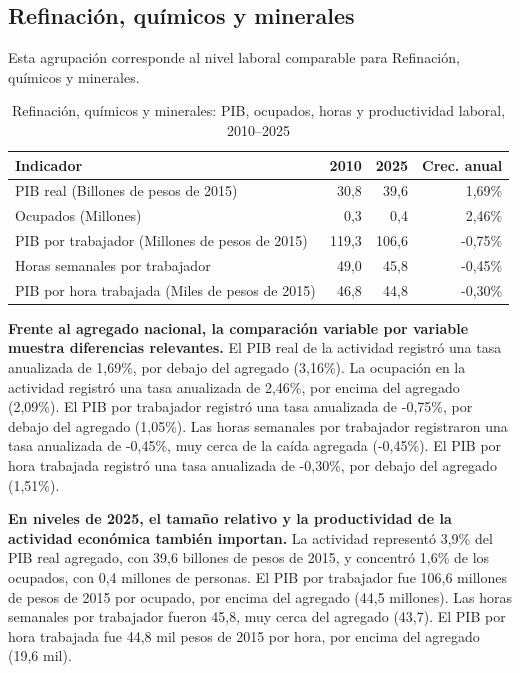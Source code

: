 \subsection{Refinación, químicos y minerales}

Esta agrupación corresponde al nivel laboral comparable para Refinación, químicos y minerales.

\begin{table}[H]
\centering
\caption{Refinación, químicos y minerales: PIB, ocupados, horas y productividad laboral, 2010--2025}
\label{tab:agg25_c04_productividad}
\small
\begin{tabular}{lrrr}
\toprule
Indicador & 2010 & 2025 & Crec. anual \\
\midrule
PIB real  (Billones de pesos de 2015) & 30,8 & 39,6 & 1,69\% \\
Ocupados (Millones) & 0,3 & 0,4 & 2,46\% \\
PIB por trabajador (Millones de pesos de 2015) & 119,3 & 106,6 & -0,75\% \\
Horas semanales por trabajador & 49,0 & 45,8 & -0,45\% \\
PIB por hora trabajada (Miles de pesos de 2015) & 46,8 & 44,8 & -0,30\% \\
\bottomrule
\end{tabular}
\end{table}

\textbf{Frente al agregado nacional, la comparación variable por variable muestra diferencias relevantes.} El PIB real de la actividad registró una tasa anualizada de 1,69\%, por debajo del agregado (3,16\%). La ocupación en la actividad registró una tasa anualizada de 2,46\%, por encima del agregado (2,09\%). El PIB por trabajador registró una tasa anualizada de -0,75\%, por debajo del agregado (1,05\%). Las horas semanales por trabajador registraron una tasa anualizada de -0,45\%, muy cerca de la caída agregada (-0,45\%). El PIB por hora trabajada registró una tasa anualizada de -0,30\%, por debajo del agregado (1,51\%).

\textbf{En niveles de 2025, el tamaño relativo y la productividad de la actividad económica también importan.} La actividad representó 3,9\% del PIB real agregado, con 39,6 billones de pesos de 2015, y concentró 1,6\% de los ocupados, con 0,4 millones de personas. El PIB por trabajador fue 106,6 millones de pesos de 2015 por ocupado, por encima del agregado (44,5 millones). Las horas semanales por trabajador fueron 45,8, muy cerca del agregado (43,7). El PIB por hora trabajada fue 44,8 mil pesos de 2015 por hora, por encima del agregado (19,6 mil).

